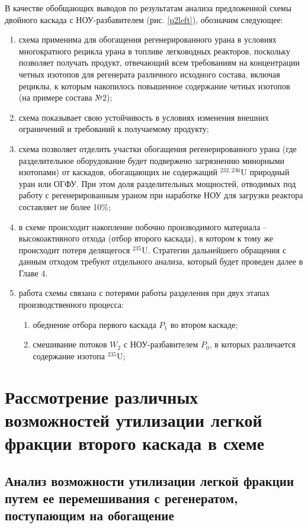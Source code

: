В качестве обобщающих выводов по результатам анализа предложенной схемы двойного каскада с НОУ-разбавителем (рис. \ref{p2left}), обозначим следующее:
\begin{enumerate}
    \item схема применима для обогащения регенерированного урана в условиях многократного рецикла урана в топливе легководных реакторов, поскольку позволяет получать продукт, отвечающий всем требованиям на концентрации четных изотопов для регенерата различного исходного состава, включая рециклы, к которым накопилось повышенное содержание четных изотопов (на примере состава №2);
    \item схема показывает свою устойчивость в условиях изменения внешних ограничений и требований к получаемому продукту;
    \item схема позволяет отделить участки обогащения регенерированного урана (где разделительное оборудование будет подвержено загрязнению минорными изотопами) от каскадов, обогащающих не содержащий $^{232,236}$U природный уран или ОГФУ. При этом доля разделительных мощностей, отводимых под работу с регенерированным ураном при наработке НОУ для загрузки реактора составляет не более 10\%;
     \item в схеме происходит накопление побочно производимого материала -- высокоактивного отхода (отбор второго каскада), в котором к тому же происходит потеря делящегося $^{235}$U. Стратегии дальнейшего обращения с данным отходом требуют отдельного анализа, который будет проведен далее в Главе 4.
    \item работа схемы связана с потерями работы разделения при двух этапах производственного процесса:
    \begin{enumerate}
        \item обеднение отбора первого каскада $P_1$ во втором каскаде;
        \item смешивание потоков $W_2$ с НОУ-разбавителем $P_0$, в которых различается содержание изотопа $^{235}$U;
    \end{enumerate}
\end{enumerate}






\section{Рассмотрение различных возможностей утилизации легкой фракции второго каскада в схеме}

\subsection{Анализ возможности утилизации легкой фракции путем ее перемешивания с регенератом, поступающим на обогащение}

